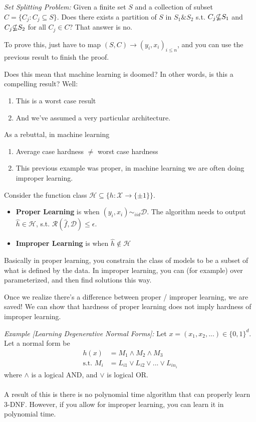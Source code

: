 \begin{sidework}
\emph{Set Splitting Problem:}
	Given a finite set $S$ and a collection of subset $ C = \{C_j : C_j \subseteq S\}$. Does there exists a partition of $S$ in $S_1 \& S_2$ s.t. $C_j \slashed \subseteq S_1$ and $C_j \slashed \subseteq S_2$ for all $C_j \in C$? That answer is no.

To prove this, just have to map $(S, C) \to (y_i, x_i)_{i\leq n}$, and you can use the previous result to finish the proof.
\end{sidework}
Does this mean that machine learning is doomed? In other words, is this a compelling result? Well:
\begin{enumerate}
	\item This is a worst case result
	\item And we've assumed a very particular architecture.
\end{enumerate}
As a rebuttal, in machine learning
\begin{enumerate}
	\item Average case hardness $\neq$ worst case hardness
	\item This previous example was proper, in machine learning we are often doing improper learning.
\end{enumerate}
\begin{definition}
	 Consider the function class $\mathcal H \subseteq \{h : \mathcal X \to \{\pm 1\}\}$.
	\begin{itemize}
		\item \textbf{Proper Learning} is when $(y_i, x_i) \sim_{iid} \mathcal D$. The algorithm needs to output $\hat h \in \mathcal H$, s.t. $\mathcal R(\hat f , \mathcal D) \leq \epsilon$.
		\item \textbf{Improper Learning} is when $\hat h \notin \mathcal H$ 
	\end{itemize}
	Basically in proper learning, you constrain the class of models to be a subset of what is defined by the data. In improper learning, you can (for example) over parameterized, and then find solutions this way.
\end{definition}
Once we realize there's a difference between proper / improper learning, we are saved! We can show that hardness of proper learning does not imply hardness of improper learning.

\begin{sidework}
	\emph{Example [Learning Degenerative Normal Forms]:} Let $x = (x_1, x_2, ...) \in \{0, 1\}^d$. Let a normal form be
\begin{align}
	h(x) & = M_1 \wedge M_2 \wedge M_3\\
	\text{s.t. } M_i & = L_{i1} \vee L_{i2} \vee ... \vee L_{i n_i}
\end{align}
where $\wedge$ is a logical AND, and $\vee$ is logical OR.\\
\\
A result of this is there is no polynomial time algorithm that can properly learn 3-DNF. However, if you allow for improper learning, you can learn it in polynomial time.
\end{sidework}

